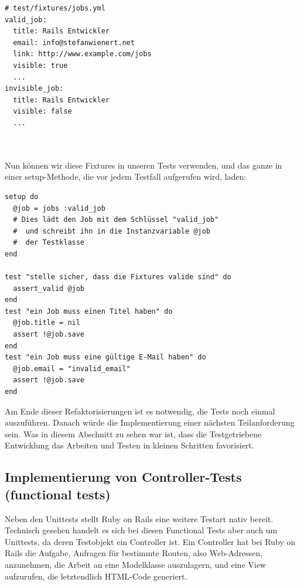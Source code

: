 \begin{lstlisting}
# test/fixtures/jobs.yml
valid_job:
  title: Rails Entwickler
  email: info@stefanwienert.net
  link: http://www.example.com/jobs
  visible: true
  ...
invisible_job:
  title: Rails Entwickler
  visible: false
  ...
  
  
\end{lstlisting}

Nun können wir diese Fixtures in unseren Tests verwenden, und das ganze in einer setup-Methode, die vor jedem Testfall aufgerufen wird, laden:
\begin{lstlisting}
setup do
  @job = jobs :valid_job
  # Dies lädt den Job mit dem Schlüssel "valid_job"
  #  und schreibt ihn in die Instanzvariable @job
  #  der Testklasse 
end

test "stelle sicher, dass die Fixtures valide sind" do
  assert_valid @job
end
test "ein Job muss einen Titel haben" do
  @job.title = nil
  assert !@job.save
end
test "ein Job muss eine gültige E-Mail haben" do
  @job.email = "invalid_email"
  assert !@job.save
end
\end{lstlisting}
Am Ende dieser Refaktorisierungen ist es notwendig, die Tests noch einmal auszuführen.
Danach würde die Implementierung einer nächsten Teilanforderung sein. Was in diesem Abschnitt zu sehen war ist, dass die Testgetriebene Entwicklung das Arbeiten und Testen in kleinen Schritten favorisiert.

\subsection{Implementierung von Controller-Tests (functional tests)}

Neben den Unittests stellt Ruby on Rails eine weitere Testart nativ bereit. Technisch gesehen handelt es sich bei diesen Functional Tests aber auch um Unittests, da deren Testobjekt ein Controller ist. 
Ein Controller hat bei Ruby on Rails die Aufgabe, Anfragen für bestimmte Routen, also Web-Adressen, anzunehmen, die Arbeit an eine Modelklasse auszulagern, und eine View aufzurufen, die letztendlich HTML-Code generiert.

